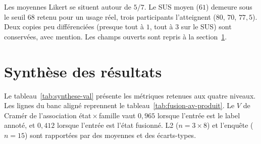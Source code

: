 Les moyennes Likert se situent autour de $5/7$. Le SUS moyen ($61$)
demeure sous le seuil $68$ retenu pour un usage réel, trois
participants l'atteignent ($80$, $70$, $77{,}5$). Deux copies peu
différenciées (presque tout à $1$, tout à $3$ sur le SUS) sont
conservées, avec mention. Les champs ouverts sont repris à la
section~\ref{sec:val-resultats}.

\section{Synthèse des résultats}
\label{sec:val-resultats}

Le tableau~\ref{tab:synthese-val} présente les métriques retenues aux
quatre niveaux. Les lignes du banc aligné reprennent le
tableau~\ref{tab:fusion-av-produit}. Le $V$ de Cramér de l'association
état\,$\times$\,famille vaut $0{,}965$ lorsque l'entrée est le label
annoté, et $0{,}412$ lorsque l'entrée est l'état fusionné. L2
($n=3\times 8$) et l'enquête ($n=15$) sont rapportées par des moyennes
et des écarts-types.

